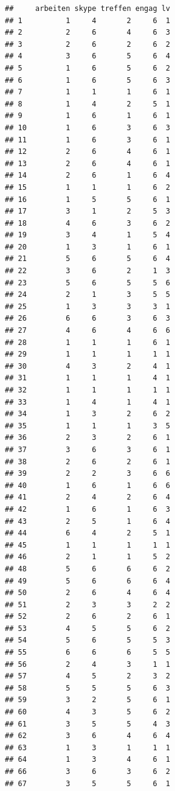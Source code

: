\documentclass[]{article}
\begin{document}
\begin{verbatim}
##     arbeiten skype treffen engag lv
## 1          1     4       2     6  1
## 2          2     6       4     6  3
## 3          2     6       2     6  2
## 4          3     6       5     6  4
## 5          1     6       5     6  2
## 6          1     6       5     6  3
## 7          1     1       1     6  1
## 8          1     4       2     5  1
## 9          1     6       1     6  1
## 10         1     6       3     6  3
## 11         1     6       3     6  1
## 12         2     6       4     6  1
## 13         2     6       4     6  1
## 14         2     6       1     6  4
## 15         1     1       1     6  2
## 16         1     5       5     6  1
## 17         3     1       2     5  3
## 18         4     6       3     6  2
## 19         3     4       1     5  4
## 20         1     3       1     6  1
## 21         5     6       5     6  4
## 22         3     6       2     1  3
## 23         5     6       5     5  6
## 24         2     1       3     5  5
## 25         1     3       3     3  1
## 26         6     6       3     6  3
## 27         4     6       4     6  6
## 28         1     1       1     6  1
## 29         1     1       1     1  1
## 30         4     3       2     4  1
## 31         1     1       1     4  1
## 32         1     1       1     1  1
## 33         1     4       1     4  1
## 34         1     3       2     6  2
## 35         1     1       1     3  5
## 36         2     3       2     6  1
## 37         3     6       3     6  1
## 38         2     6       2     6  1
## 39         2     2       3     6  6
## 40         1     6       1     6  6
## 41         2     4       2     6  4
## 42         1     6       1     6  3
## 43         2     5       1     6  4
## 44         6     4       2     5  1
## 45         1     1       1     1  1
## 46         2     1       1     5  2
## 48         5     6       6     6  2
## 49         5     6       6     6  4
## 50         2     6       4     6  4
## 51         2     3       3     2  2
## 52         2     6       2     6  1
## 53         4     5       5     6  2
## 54         5     6       5     5  3
## 55         6     6       6     5  5
## 56         2     4       3     1  1
## 57         4     5       2     3  2
## 58         5     5       5     6  3
## 59         3     2       5     6  1
## 60         4     3       5     6  2
## 61         3     5       5     4  3
## 62         3     6       4     6  4
## 63         1     3       1     1  1
## 64         1     3       4     6  1
## 66         3     6       3     6  2
## 67         3     5       5     6  1

\end{verbatim}
\end{document}
